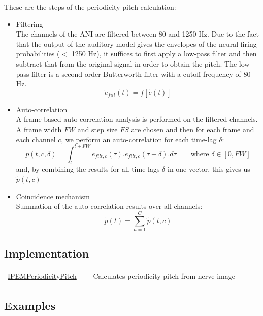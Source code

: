 These are the steps of the periodicity pitch calculation:

\begin{itemize}
\item Filtering\\
    The channels of the ANI are filtered between 80 and 1250 Hz. Due
    to the fact that the output of the auditory model gives the
    envelopes of the neural firing probabilities ($<$ 1250 Hz), it
    suffices to first apply a low-pass filter and then subtract that
    from the original signal in order to obtain the pitch. The
    low-pass filter is a second order Butterworth filter with a
    cutoff frequency of 80 Hz.
    \[ \tilde{e}_{filt}(t) = f[\tilde{e}(t)] \]
\item Auto-correlation\\
    A frame-based auto-correlation analysis is performed on the
    filtered channels. A frame width $FW$ and step size $FS$ are
    chosen and then for each frame and each channel $c$, we perform
    an auto-correlation for each time-lag $\delta$:
    \[
        p(t,c,\delta) = \int_{t}^{t+FW}{e_{filt,c}(\tau).e_{filt,c}(\tau+\delta).d\tau}
        \qquad \textrm{where $\delta \in [0,FW]$}
    \]
    and, by combining the results for all time lags $\delta$ in one
    vector, this gives us $\tilde{p}(t,c)$
\item Coincidence mechanism\\
    Summation of the auto-correlation results over all channels:
    \[ \tilde{p}(t) = \sum_{n=1}^{C}\tilde{p}(t,c) \]
\end{itemize}


\subsection{Implementation}

\begin{tabularx}{\linewidth}{llX}
\hyperlink{FuncRef:IPEMPeriodicityPitch}{IPEMPeriodicityPitch} & - & Calculates periodicity pitch from nerve image\\
\end{tabularx}


\subsection{Examples}

